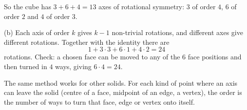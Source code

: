 So the cube has $3+6+4=\boxed{13}$ axes of rotational symmetry: $3$ of order $4$, $6$ of order $2$ and $4$ of order $3$.

(b) Each axis of order $k$ gives $k-1$ non-trivial rotations, and different axes give different rotations. Together with the identity there are
\[
1+3\cdot3+6\cdot1+4\cdot2=\boxed{24}
\]
rotations. Check: a chosen face can be moved to any of the $6$ face positions and then turned in $4$ ways, giving $6\cdot4=24$.

The same method works for other solids. For each kind of point where an axis can leave the solid (centre of a face, midpoint of an edge, a vertex), the order is the number of ways to turn that face, edge or vertex onto itself.

